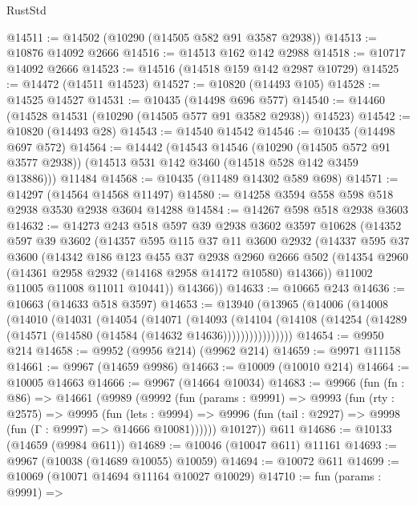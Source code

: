 \begin{lexlean}{RustStd}
\begin{coremodule}
{\begin{coremodule}
{{{{{{{{{{{{{{{{{{{{{{{{{{{{{{{{{{{{{{{{{{{{{{{{{{{{{{{{{{{{{{{{{{{{{{{{{{{{{{@14511 := @14502 (@10290 (@14505 @582 @91 @3587 @2938))
@14513 := @10876 @14092 @2666
@14516 := @14513 @162 @142 @2988
@14518 := @10717 @14092 @2666
@14523 := @14516 (@14518 @159 @142 @2987 @10729)
@14525 := @14472 (@14511 @14523)
@14527 := @10820 (@14493 @105)
@14528 := @14525 @14527
@14531 := @10435 (@14498 @696 @577)
@14540 := @14460 (@14528 @14531 (@10290 (@14505 @577 @91 @3582 @2938)) @14523)
@14542 := @10820 (@14493 @28)
@14543 := @14540 @14542
@14546 := @10435 (@14498 @697 @572)
@14564 := @14442
    (@14543
      @14546
      (@10290 (@14505 @572 @91 @3577 @2938))
      (@14513 @531 @142 @3460 (@14518 @528 @142 @3459 @13886)))
    @11484
@14568 := @10435 (@11489 @14302 @589 @698)
@14571 := @14297 (@14564 @14568 @11497)
@14580 := @14258 @3594 @558 @598 @518 @2938 @3530 @2938 @3604 @14288
@14584 := @14267 @598 @518 @2938 @3603
@14632 := @14273
    @243
    @518
    @597
    @39
    @2938
    @3602
    @3597
    @10628
    (@14352
      @597
      @39
      @3602
      (@14357
        @595
        @115
        @37
        @11
        @3600
        @2932
        (@14337
          @595
          @37
          @3600
          (@14342
            @186
            @123
            @455
            @37
            @2938
            @2960
            @2666
            @502
            (@14354 @2960 (@14361 @2958 @2932 (@14168 @2958 @14172 @10580) @14366))
            @11002
            @11005
            @11008
            @11011
            @10441))
        @14366))
@14633 := @10665 @243
@14636 := @10663 (@14633 @518 @3597)
@14653 := @13940
    (@13965
      (@14006
        (@14008
          (@14010
            (@14031
              (@14054
                (@14071
                  (@14093
                    (@14104
                      (@14108 (@14254 (@14289 (@14571 (@14580 (@14584 (@14632 @14636))))))))))))))))
@14654 := @9950 @214
@14658 := @9952 (@9956 @214) (@9962 @214)
@14659 := @9971 @11158
@14661 := @9967 (@14659 @9986)
@14663 := @10009 (@10010 @214)
@14664 := @10005 @14663
@14666 := @9967 (@14664 @10034)
@14683 := @9966
    (fun (fn : @86) =>
    @14661
      (@9989
        (@9992
          (fun (params : @9991) =>
          @9993
            (fun (rty : @2575) =>
            @9995
              (fun (lets : @9994) =>
              @9996 (fun (tail : @2927) => @9998 (fun (Γ : @9997) => @14666 @10081))))))
        @10127))
    @611
@14686 := @10133 (@14659 (@9984 @611))
@14689 := @10046 (@10047 @611) @11161
@14693 := @9967 (@10038 (@14689 @10055) @10059)
@14694 := @10072 @611
@14699 := @10069 (@10071 @14694 @11164 @10027 @10029)
@14710 := fun (params : @9991) =>
}}}}}}}}}}}}}}}}}}}}}}}}}}}}}}}}}}}}}}}}}}}}}}}}}}}}}}}}}}}}}}}}}}}}}}}}}}}}}}
\end{coremodule}}
\end{coremodule}
\end{lexlean}
